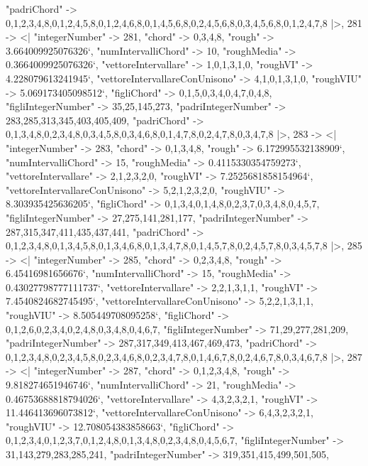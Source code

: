 \documentclass[
]{article}
\begin{document}
\begin{DatasetVerbatim}
    "padriChord" -> {{0,1,2,3,4,8},{0,1,2,4,5,8},{0,1,2,4,6,8},{0,1,4,5,6,8},{0,2,4,5,6,8},{0,3,4,5,6,8},{0,1,2,4,7,8}}
  |>,
  281 -> <|
    "integerNumber" -> 281,
    "chord" -> {0,3,4,8},
    "rough" -> 3.664009925076326`,
    "numIntervalliChord" -> 10,
    "roughMedia" -> 0.3664009925076326`,
    "vettoreIntervallare" -> {1,0,1,3,1,0},
    "roughVI" -> 4.228079613241945`,
    "vettoreIntervallareConUnisono" -> {4,1,0,1,3,1,0},
    "roughVIU" -> 5.069173405098512`,
    "figliChord" -> {{0,1,5},{0,3,4},{0,4,7},{0,4,8}},
    "figliIntegerNumber" -> {35,25,145,273},
    "padriIntegerNumber" -> {283,285,313,345,403,405,409},
    "padriChord" -> {{0,1,3,4,8},{0,2,3,4,8},{0,3,4,5,8},{0,3,4,6,8},{0,1,4,7,8},{0,2,4,7,8},{0,3,4,7,8}}
  |>,
  283 -> <|
    "integerNumber" -> 283,
    "chord" -> {0,1,3,4,8},
    "rough" -> 6.172995532138909`,
    "numIntervalliChord" -> 15,
    "roughMedia" -> 0.4115330354759273`,
    "vettoreIntervallare" -> {2,1,2,3,2,0},
    "roughVI" -> 7.2525681858154964`,
    "vettoreIntervallareConUnisono" -> {5,2,1,2,3,2,0},
    "roughVIU" -> 8.303935425636205`,
    "figliChord" -> {{0,1,3,4},{0,1,4,8},{0,2,3,7},{0,3,4,8},{0,4,5,7}},
    "figliIntegerNumber" -> {27,275,141,281,177},
    "padriIntegerNumber" -> {287,315,347,411,435,437,441},
    "padriChord" -> {{0,1,2,3,4,8},{0,1,3,4,5,8},{0,1,3,4,6,8},{0,1,3,4,7,8},{0,1,4,5,7,8},{0,2,4,5,7,8},{0,3,4,5,7,8}}
  |>,
  285 -> <|
    "integerNumber" -> 285,
    "chord" -> {0,2,3,4,8},
    "rough" -> 6.45416981656676`,
    "numIntervalliChord" -> 15,
    "roughMedia" -> 0.43027798777111737`,
    "vettoreIntervallare" -> {2,2,1,3,1,1},
    "roughVI" -> 7.4540824682745495`,
    "vettoreIntervallareConUnisono" -> {5,2,2,1,3,1,1},
    "roughVIU" -> 8.505449708095258`,
    "figliChord" -> {{0,1,2,6},{0,2,3,4},{0,2,4,8},{0,3,4,8},{0,4,6,7}},
    "figliIntegerNumber" -> {71,29,277,281,209},
    "padriIntegerNumber" -> {287,317,349,413,467,469,473},
    "padriChord" -> {{0,1,2,3,4,8},{0,2,3,4,5,8},{0,2,3,4,6,8},{0,2,3,4,7,8},{0,1,4,6,7,8},{0,2,4,6,7,8},{0,3,4,6,7,8}}
  |>,
  287 -> <|
    "integerNumber" -> 287,
    "chord" -> {0,1,2,3,4,8},
    "rough" -> 9.818274651946746`,
    "numIntervalliChord" -> 21,
    "roughMedia" -> 0.46753688818794026`,
    "vettoreIntervallare" -> {4,3,2,3,2,1},
    "roughVI" -> 11.446413696073812`,
    "vettoreIntervallareConUnisono" -> {6,4,3,2,3,2,1},
    "roughVIU" -> 12.708054383858663`,
    "figliChord" -> {{0,1,2,3,4},{0,1,2,3,7},{0,1,2,4,8},{0,1,3,4,8},{0,2,3,4,8},{0,4,5,6,7}},
    "figliIntegerNumber" -> {31,143,279,283,285,241},
    "padriIntegerNumber" -> {319,351,415,499,501,505},

\end{DatasetVerbatim}
\end{document}
